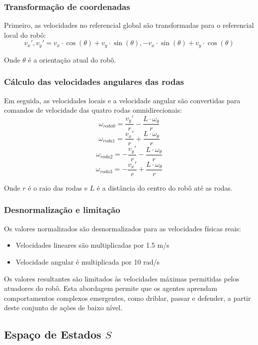 \subsubsection{Transformação de coordenadas}

Primeiro, as velocidades no referencial global são transformadas para o referencial local do robô:
$$v_x', v_y' = v_x \cdot \cos(\theta) + v_y \cdot \sin(\theta), -v_x \cdot \sin(\theta) + v_y \cdot \cos(\theta)$$

Onde $\theta$ é a orientação atual do robô.

\subsubsection{Cálculo das velocidades angulares das rodas}

Em seguida, as velocidades locais e a velocidade angular são convertidas para comandos de velocidade das quatro rodas omnidirecionais:
$$\omega_{roda0} = \frac{v_y'}{r} - \frac{L \cdot \omega_{\theta}}{r}$$
$$\omega_{roda1} = \frac{v_x'}{r} + \frac{L \cdot \omega_{\theta}}{r}$$
$$\omega_{roda2} = -\frac{v_y'}{r} - \frac{L \cdot \omega_{\theta}}{r}$$
$$\omega_{roda3} = -\frac{v_x'}{r} + \frac{L \cdot \omega_{\theta}}{r}$$

Onde $r$ é o raio das rodas e $L$ é a distância do centro do robô até as rodas.

\subsubsection{Desnormalização e limitação}

Os valores normalizados são desnormalizados para as velocidades físicas reais:
\begin{itemize}
    \item Velocidades lineares são multiplicadas por 1.5 m/s
    \item Velocidade angular é multiplicada por 10 rad/s
\end{itemize}

Os valores resultantes são limitados às velocidades máximas permitidas pelos atuadores do robô. Esta abordagem permite que os agentes aprendam comportamentos complexos emergentes, como driblar, passar e defender, a partir deste conjunto de ações de baixo nível.

\subsection{Espaço de Estados $S$}

